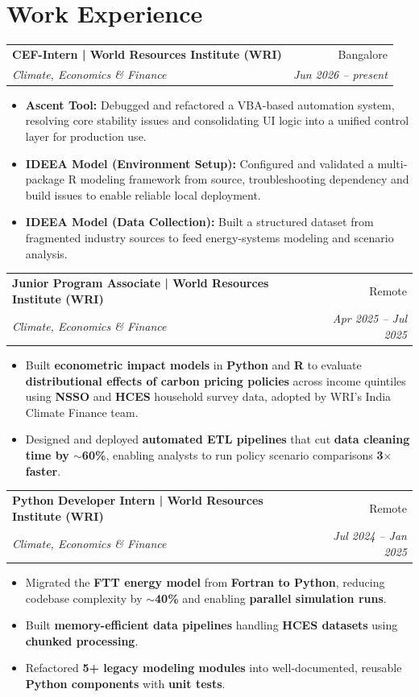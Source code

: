 \documentclass[11pt,a4paper]{article}
\makeatletter
\newcommand{\resumeSubheading}[4]{
    \vspace{4pt}
    \begin{tabular*}{\textwidth}{@{} p{0.73\textwidth} @{\extracolsep{\fill}} r @{}}
        \textbf{#1} & #2 \\
        \textit{#3} & \textit{#4} \\
    \end{tabular*}
    \vspace{2pt}
}
\makeatother
\begin{document}
\section{Work Experience}

\resumeSubheading
    {CEF-Intern | World Resources Institute (WRI)}
    {Bangalore}
    {Climate, Economics \& Finance}
    {Jun 2026 -- present}
\begin{itemize}[leftmargin=*, itemsep=3pt, parsep=1pt]
    \item \textbf{Ascent Tool:} Debugged and refactored a VBA-based automation system, resolving core stability issues and consolidating UI logic into a unified control layer for production use.
    \item \textbf{IDEEA Model (Environment Setup):} Configured and validated a multi-package R modeling framework from source, troubleshooting dependency and build issues to enable reliable local deployment.
    \item \textbf{IDEEA Model (Data Collection):} Built a structured dataset from fragmented industry sources to feed energy-systems modeling and scenario analysis.
\end{itemize}

\resumeSubheading
    {Junior Program Associate | World Resources Institute (WRI)}
    {Remote}
    {Climate, Economics \& Finance}
    {Apr 2025 -- Jul 2025}
\begin{itemize}[leftmargin=*, itemsep=3pt, parsep=1pt]
    \item Built \textbf{econometric impact models} in \textbf{Python} and \textbf{R} to evaluate \textbf{distributional effects of carbon pricing policies} across income quintiles using \textbf{NSSO} and \textbf{HCES} household survey data, adopted by WRI's India Climate Finance team.
    \item Designed and deployed \textbf{automated ETL pipelines} that cut \textbf{data cleaning time by $\sim$60\%}, enabling analysts to run policy scenario comparisons \textbf{3$\times$ faster}.
\end{itemize}

\resumeSubheading
    {Python Developer Intern | World Resources Institute (WRI)}
    {Remote}
    {Climate, Economics \& Finance}
    {Jul 2024 -- Jan 2025}
\begin{itemize}[leftmargin=*, itemsep=3pt, parsep=1pt]
    \item Migrated the \textbf{FTT energy model} from \textbf{Fortran to Python}, reducing codebase complexity by $\sim$\textbf{40\%} and enabling \textbf{parallel simulation runs}.
    \item Built \textbf{memory-efficient data pipelines} handling \textbf{HCES datasets} using \textbf{chunked processing}.
    \item Refactored \textbf{5+ legacy modeling modules} into well-documented, reusable \textbf{Python components} with \textbf{unit tests}.
\end{itemize}
\end{document}

